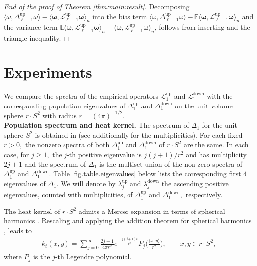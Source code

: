 \documentclass[10pt]{article}
\DeclareMathOperator{\up}{up}
\DeclareMathOperator{\down}{down}
\theoremstyle{plain}
\theoremstyle{definition}
\theoremstyle{remark}
\begin{document}
\begin{proof}[End of the proof of Theorem \ref{thm:main:result}]
    Decomposing $\langle\omega,\Delta_{\ell-1}^{\up}\omega\rangle-\langle\boldsymbol{\omega},\mathscr{L}_{\ell-1}^{\up}\boldsymbol{\omega}\rangle_n$ into the bias term $\langle\omega,\Delta_{\ell-1}^{\up}\omega\rangle-\mathbb{E} \langle\boldsymbol{\omega},\mathscr{L}_{\ell-1}^{\up}\boldsymbol{\omega}\rangle_n$ and the variance term $\mathbb{E} \langle\boldsymbol{\omega},\mathscr{L}_{\ell-1}^{\up}\boldsymbol{\omega}\rangle_n-\langle\boldsymbol{\omega},\mathscr{L}_{\ell-1}^{\up}\boldsymbol{\omega}\rangle_n$,  follows from inserting  and the triangle inequality.
\end{proof}




\section{Experiments}
\label{section:experiments}

We compare the spectra of the empirical operators $\mathscr{L}_1^{\up}$ and $\mathscr{L}_1^{\down}$ with the corresponding population eigenvalues of $\Delta_1^{\up}$ and $\Delta_1^{\down}$ on the unit volume sphere $r\cdot S^2$ with radius $r = (4\pi)^{-1/2}.$\\ 

\noindent\textbf{Population spectrum and heat kernel.} The spectrum of $\Delta_{1}$ for the unit sphere $S^2$ is obtained in \cite[Theorems A-C]{Folland89} (see additionally \cite[Chapter 4]{MR304972} for the multiplicities). For each fixed $r > 0,$ the nonzero spectra of both $\Delta_1^{\up}$ and $\Delta_1^{\down}$ of $r\cdot S^2$ are the same. In each case, for $j \geq 1,$ the $j$-th positive eigenvalue is $j(j+1)/r^2$ and has multiplicity $2j+1$ and the spectrum of $\Delta_1$ is the multiset union of the non-zero spectra of $\Delta_1^{\up}$ and $\Delta_1^{\down}.$ Table \ref{fig.table.eigenvalues} below lists the corresponding first $4$ eigenvalues of $\Delta_1.$ We will denote by $\lambda_j^{\up}$ and $\lambda_j^{\down}$ the ascending positive eigenvalues, counted with multiplicities, of $\Delta_1^{\up}$ and $\Delta_1^{\down},$ respectively.

The heat kernel of $r\cdot S^2$ admits a Mercer expansion in terms of spherical harmonics \cite{zhao.fams.2018.00001, atkinson2012spherical}. Rescaling and applying the addition theorem for spherical harmonics \cite{Male_ek_2001}, leads to 
\begin{align}
    \label{eq.heat.kernel.sphere}
    k_t(x, y) = \sum_{j = 0}^\infty \frac{2j+1}{4\pi r^2}e^{-\tfrac{j(j+1)t}{r^2}}P_j\Big(\frac{\langle x, y\rangle}{r^2}\Big), \qquad x, y \in r\cdot S^2,
\end{align}
where $P_j$ is the $j$-th Legendre polynomial.
\end{document}
